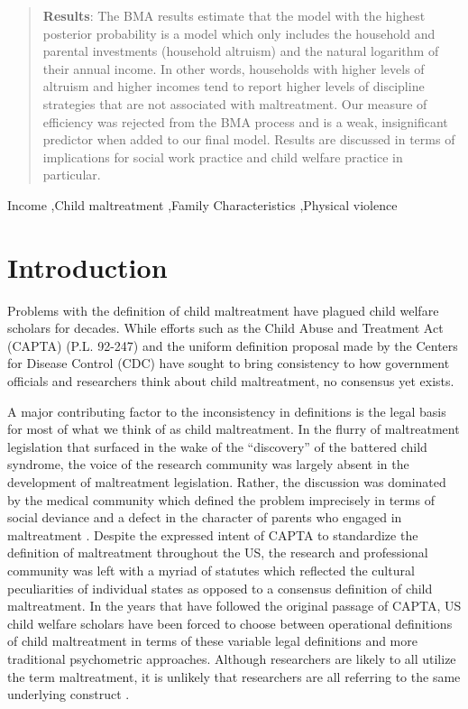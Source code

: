 \documentclass[1p, review]{elsarticle}\usepackage[]{graphicx}\usepackage[]{color}
\begin{document}
\begin{frontmatter}
\begin{abstract}
  \textbf{Results}: The BMA results estimate that the model with the highest posterior probability is a model which only includes the household and parental investments (household altruism) and the natural logarithm of their annual income. In other words, households with higher levels of altruism and higher incomes tend to report higher levels of discipline strategies that are not associated with maltreatment. Our measure of efficiency was rejected from the BMA process and is a weak, insignificant predictor when added to our final model. Results are discussed in terms of implications for social work practice and child welfare practice in particular. 
  
  \end{abstract}

  \begin{keyword}
  Income \sep Child maltreatment \sep Family Characteristics \sep Physical violence
  \end{keyword}

\end{frontmatter}





\linenumbers

\section{Introduction}

Problems with the definition of child maltreatment have plagued child welfare scholars for decades. While efforts such as the Child Abuse and Treatment Act (CAPTA) (P.L. 92-247) and the uniform definition proposal made by the Centers for Disease Control (CDC) \citep{Leeb2008} have sought to bring consistency to how government officials and researchers think about child maltreatment, no consensus yet exists.

A major contributing factor to the inconsistency in definitions is the legal basis for most of what we think of as child maltreatment. In the flurry of maltreatment legislation that surfaced in the wake of the \citet{Kempe1962} ``discovery'' of the battered child syndrome, the voice of the research community was largely absent in the development of maltreatment legislation. Rather, the discussion was dominated by the medical community which defined the problem imprecisely in terms of social deviance and a defect in the character of parents who engaged in maltreatment \citep{Nelson1986}. Despite the expressed intent of CAPTA to standardize the definition of maltreatment throughout the US, the research and professional community was left with a myriad of statutes which reflected the cultural peculiarities of individual states as opposed to a consensus definition of child maltreatment. In the years that have followed the original passage of CAPTA, US child welfare scholars have been forced to choose between operational definitions of child maltreatment in terms of these variable legal definitions and more traditional psychometric approaches. Although researchers are likely to all utilize the term maltreatment, it is unlikely that researchers are all referring to the same underlying construct \citep{Runyan2005}. 
\end{document}
